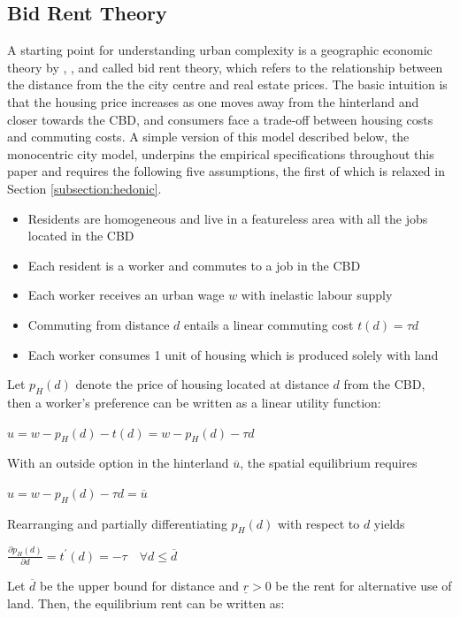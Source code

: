 \documentclass{article}
\begin{document}
\subsection{Bid Rent Theory} \label{subsection:monocentric}
A starting point for understanding urban complexity is a geographic economic theory by \citet{AlonsoWilliam1964Lalu}, \citet{MuthRichardF.1969Cah:}, and \citet{MillsEdwinSmith1972Sits} called bid rent theory, which refers to the relationship between the distance from the the city centre and real estate prices. The basic intuition is that the housing price increases as one moves away from the hinterland and closer towards the CBD, and consumers face a trade-off between housing costs and commuting costs. A simple version of this model described below, the monocentric city model, underpins the empirical specifications throughout this paper and requires the following five assumptions, the first of which is relaxed in Section \ref{subsection:hedonic}.
\begin{itemize}
\setlength\itemsep{0.1em}
\item Residents are homogeneous and live in a featureless area with all the jobs located in the CBD
\item Each resident is a worker and commutes to a job in the CBD
\item Each worker receives an urban wage $w$ with inelastic labour supply
\item Commuting from distance $d$ entails a linear commuting cost $t(d) = \tau d$
\item Each worker consumes 1 unit of housing which is produced solely  with land
\end{itemize}
Let $p_H (d)$ denote the price of housing located at distance $d$ from the CBD, then a worker's preference can be written as a linear utility function:
\begin{center}
$u = w - p _ { H } ( d ) - t ( d ) = w - p _ { H } ( d ) - \tau d$
\end{center}
With an outside option in the hinterland $\overline{u}$, the spatial equilibrium requires
\begin{center}
$u = w - p _ { H } ( d ) - \tau d = \overline { u }$
\end{center}
Rearranging and partially differentiating $p_H (d)$ with respect to $d$ yields 
\begin{center}
$\frac { \partial p _ { H } ( d ) } { \partial d } = t ^ { \prime } ( d ) = - \tau \quad \forall d \leq \overline { d }$
\end{center}
Let $\overline{d}$ be the upper bound for distance and $\underline{r} > 0$ be the rent for alternative use of land. Then, the equilibrium rent can be written as:
\end{document}
